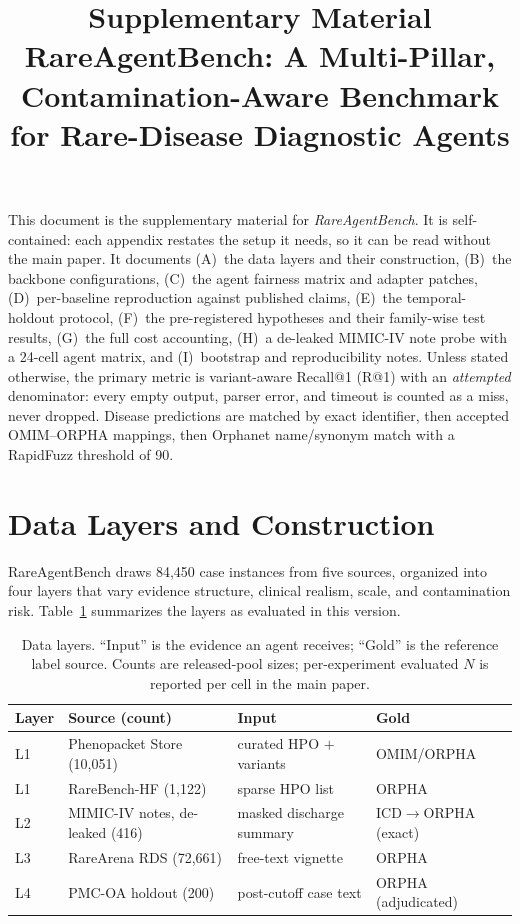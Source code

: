 \documentclass[letterpaper]{article} %
\title{Supplementary Material\\
RareAgentBench: A Multi-Pillar, Contamination-Aware Benchmark for Rare-Disease Diagnostic Agents}
\author{}
\begin{document}
\maketitle

\noindent
This document is the supplementary material for \emph{RareAgentBench}. It is
self-contained: each appendix restates the setup it needs, so it can be read
without the main paper. It documents (A)~the data layers and their construction,
(B)~the backbone configurations, (C)~the agent fairness matrix and adapter
patches, (D)~per-baseline reproduction against published claims,
(E)~the temporal-holdout protocol, (F)~the pre-registered hypotheses and their
family-wise test results, (G)~the full cost accounting, (H)~a de-leaked
MIMIC-IV note probe with a 24-cell agent matrix, and (I)~bootstrap and
reproducibility notes. Unless stated otherwise, the primary metric is
variant-aware Recall@1 (R@1) with an \emph{attempted} denominator: every empty
output, parser error, and timeout is counted as a miss, never dropped. Disease
predictions are matched by exact identifier, then accepted OMIM--ORPHA mappings,
then Orphanet name/synonym match with a RapidFuzz threshold of 90.

\section{Data Layers and Construction}
\label{app:data}

RareAgentBench draws 84,450 case instances from five sources, organized into
four layers that vary evidence structure, clinical realism, scale, and
contamination risk. Table~\ref{tab:datalayers} summarizes the layers as
evaluated in this version.

\begin{table}[h]
\centering
\scriptsize
\setlength{\tabcolsep}{3.5pt}
\caption{Data layers. ``Input'' is the evidence an agent receives; ``Gold'' is
the reference label source. Counts are released-pool sizes; per-experiment
evaluated $N$ is reported per cell in the main paper.}
\label{tab:datalayers}
\begin{tabular}{@{}llll@{}}
\toprule
Layer & Source (count) & Input & Gold \\
\midrule
L1 & Phenopacket Store (10,051) & curated HPO $+$ variants & OMIM/ORPHA \\
L1 & RareBench-HF (1,122) & sparse HPO list & ORPHA \\
L2 & MIMIC-IV notes, de-leaked (416) & masked discharge summary & ICD$\rightarrow$ORPHA (exact) \\
L3 & RareArena RDS (72,661) & free-text vignette & ORPHA \\
L4 & PMC-OA holdout (200) & post-cutoff case text & ORPHA (adjudicated) \\
\bottomrule
\end{tabular}
\end{table}
\end{document}
